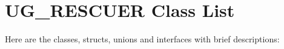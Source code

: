 \section{UG\_\-RESCUER Class List}
Here are the classes, structs, unions and interfaces with brief descriptions:\begin{CompactList}
\item{}
\item{}
\item{}
\end{CompactList}
